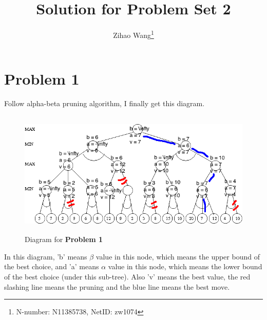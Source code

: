 \documentclass[11pt]{article}
\author{Zihao Wang\footnote{N-number: N11385738, NetID: zw1074}
	}
\title{\textbf{Solution for Problem Set 2}}
\begin{document}
	\maketitle
	\section*{Problem 1}
	Follow alpha-beta pruning algorithm, I finally get this diagram.
	\begin{figure}[!htbp]
		\centering 
		\includegraphics[height=6cm ,width=12cm]{ps2.gif}
		\caption{Diagram for \textbf{Problem 1}} \label{figure7}
	\end{figure}
	
	In this diagram, 'b' means $ \beta $ value in this node, which means the upper bound of the best choice, and 'a' means $ \alpha $ value in this node, which means the lower bound of the best choice (under this sub-tree). Also 'v' means the best value, the red slashing line means the pruning and the blue line means the best move.
	
\end{document}

